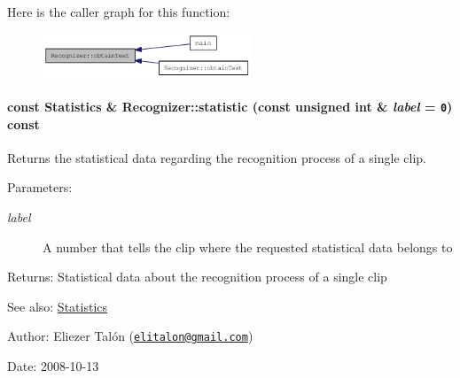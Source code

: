 Here is the caller graph for this function:\nopagebreak
\begin{figure}[H]
\begin{center}
\leavevmode
\includegraphics[width=176pt]{class_recognizer_008a0ea69a912ff54882dd20d18adcf9_icgraph}
\end{center}
\end{figure}
\hypertarget{class_recognizer_b941b1ad42c3bacb3c829acf7fc689de}{
\paragraph[{statistic}]{\setlength{\rightskip}{0pt plus 5cm}const {\bf Statistics} \& Recognizer::statistic (const unsigned int \& {\em label} = {\tt 0}) const}\hfill}
\label{class_recognizer_b941b1ad42c3bacb3c829acf7fc689de}


Returns the statistical data regarding the recognition process of a single clip. 

\begin{Desc}
\item[Parameters:]
\begin{description}
\item[{\em label}]A number that tells the clip where the requested statistical data belongs to\end{description}
\end{Desc}
\begin{Desc}
\item[Returns:]Statistical data about the recognition process of a single clip\end{Desc}
\begin{Desc}
\item[See also:]\hyperlink{class_statistics}{Statistics}\end{Desc}
\begin{Desc}
\item[Author:]Eliezer Talón (\href{mailto:elitalon@gmail.com}{\tt elitalon@gmail.com}) \end{Desc}
\begin{Desc}
\item[Date:]2008-10-13 \end{Desc}


